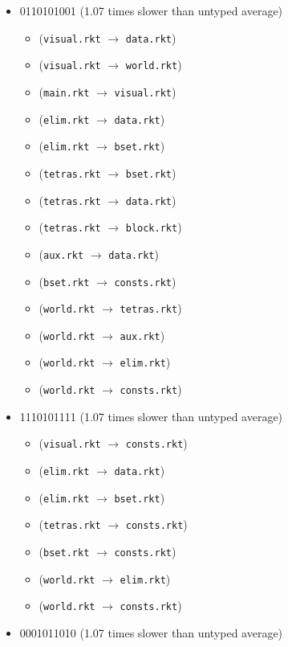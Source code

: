 \documentclass{article}
\newcommand{\mono}[1]{\texttt{#1}}
\begin{document}
\begin{itemize}
\item 0110101001 (1.07 times slower than untyped average)
  \begin{itemize}
  \item (\mono{visual.rkt} $\rightarrow$ \mono{data.rkt})
  \item (\mono{visual.rkt} $\rightarrow$ \mono{world.rkt})
  \item (\mono{main.rkt} $\rightarrow$ \mono{visual.rkt})
  \item (\mono{elim.rkt} $\rightarrow$ \mono{data.rkt})
  \item (\mono{elim.rkt} $\rightarrow$ \mono{bset.rkt})
  \item (\mono{tetras.rkt} $\rightarrow$ \mono{bset.rkt})
  \item (\mono{tetras.rkt} $\rightarrow$ \mono{data.rkt})
  \item (\mono{tetras.rkt} $\rightarrow$ \mono{block.rkt})
  \item (\mono{aux.rkt} $\rightarrow$ \mono{data.rkt})
  \item (\mono{bset.rkt} $\rightarrow$ \mono{consts.rkt})
  \item (\mono{world.rkt} $\rightarrow$ \mono{tetras.rkt})
  \item (\mono{world.rkt} $\rightarrow$ \mono{aux.rkt})
  \item (\mono{world.rkt} $\rightarrow$ \mono{elim.rkt})
  \item (\mono{world.rkt} $\rightarrow$ \mono{consts.rkt})
  \end{itemize}
\item 1110101111 (1.07 times slower than untyped average)
  \begin{itemize}
  \item (\mono{visual.rkt} $\rightarrow$ \mono{consts.rkt})
  \item (\mono{elim.rkt} $\rightarrow$ \mono{data.rkt})
  \item (\mono{elim.rkt} $\rightarrow$ \mono{bset.rkt})
  \item (\mono{tetras.rkt} $\rightarrow$ \mono{consts.rkt})
  \item (\mono{bset.rkt} $\rightarrow$ \mono{consts.rkt})
  \item (\mono{world.rkt} $\rightarrow$ \mono{elim.rkt})
  \item (\mono{world.rkt} $\rightarrow$ \mono{consts.rkt})
  \end{itemize}
\item 0001011010 (1.07 times slower than untyped average)
  \begin{itemize}

\end{itemize}
\end{itemize}
\end{document}
